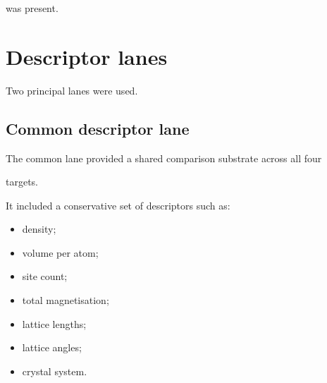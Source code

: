 \documentclass[11pt,a4paper,oneside]{report}
\begin{document}
was present.





\section{Descriptor lanes}



Two principal lanes were used.



\subsection{Common descriptor lane}



The common lane provided a shared comparison substrate across all four

targets.



It included a conservative set of descriptors such as:



\begin{itemize}



\item

density;



\item

volume per atom;



\item

site count;



\item

total magnetisation;



\item

lattice lengths;



\item

lattice angles;



\item

crystal system.



\end{itemize}
\end{document}
